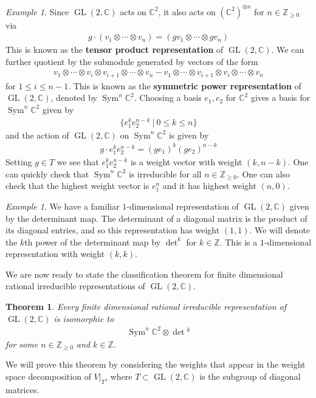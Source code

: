 \documentclass{amsart}
\newcommand{\st}{\ \vert \ }
\DeclareMathOperator{\GL}{GL}
\DeclareMathOperator{\Sym}{Sym}
\newcommand{\C}{\mathbb{C}}
\newcommand{\Z}{\mathbb{Z}}
\newcommand{\set}[1]{\{#1\}}
\numberwithin{equation}{section}
\theoremstyle{plain} %
\newtheorem{theorem}[equation]{Theorem}
\theoremstyle{definition}
\theoremstyle{remark}
\newtheorem{example}[equation]{Example}
\begin{document}
\begin{example}
	Since $\GL(2,\C)$ acts on $\C^2$, it also acts on $(\C^2)^{\otimes n}$ for $n\in \Z_{\geq 0}$ via \begin{align*}
		g\cdot (v_1\otimes \cdots \otimes v_n) = (gv_1\otimes \cdots \otimes gv_n)
	\end{align*} This is known as the \textbf{tensor product representation} of $\GL(2,\C)$. We can further
	quotient by the submodule generated by vectors of the form \begin{align*}
		v_1\otimes \cdots \otimes v_i \otimes v_{i+1} \otimes \cdots \otimes v_n - v_1\otimes \cdots \otimes v_{i+1} \otimes v_i \otimes \cdots \otimes v_n
	\end{align*} for $1\leq i \leq n-1$. This is known as the \textbf{symmetric power representation} of $\GL(2,\C)$, denoted by $\Sym^n\C^2$.
	Choosing a basis $e_1,e_2$ for $\C^2$ gives a basis for $\Sym^n\C^2$ given by \begin{align*}
		\set{e_1^ke_2^{n-k} \st 0\leq k \leq n}
	\end{align*} and the action of $\GL(2,\C)$ on $\Sym^n\C^2$ is given by \begin{align*}
		g\cdot e_1^ke_2^{n-k} = (ge_1)^k(ge_2)^{n-k}
	\end{align*} Setting $g\in T$ we see that $e_1^ke_2^{n-k}$ is a weight vector with weight $(k,n-k)$. One
	can quickly check that $\Sym^n\C^2$ is irreducible for all $n\in \Z_{\geq 0}$. One can also check
	that the highest weight vector is $e_1^n$ and it has highest weight $(n,0)$.
\end{example}

\begin{example}
	We have a familiar $1$-dimensional representation of $\GL(2,\C)$ given by the determinant map. The determinant of a diagonal matrix is the product of its diagonal entries,
	and so this representation has weight $(1,1)$. We will denote
	the $k$th power of the determinant map by $\det^k$ for $k\in\Z$. This is a $1$-dimensional representation with weight $(k,k)$.
\end{example}

We are now ready to state the classification theorem for finite dimensional rational irreducible representations of $\GL(2,\C)$.
\begin{theorem}
	Every finite dimensional rational irreducible representation of $\GL(2,\C)$ is isomorphic to \begin{align*}
		\Sym^n\C^2 \otimes \det{}^k
	\end{align*} for some $n\in \Z_{\geq 0}$ and $k\in \Z$.
\end{theorem}
We will prove this theorem by considering the weights that appear in the weight space decomposition of $V\vert_{T}$, where $T\subset \GL(2,\C)$ is the subgroup of diagonal matrices.
\end{document}
